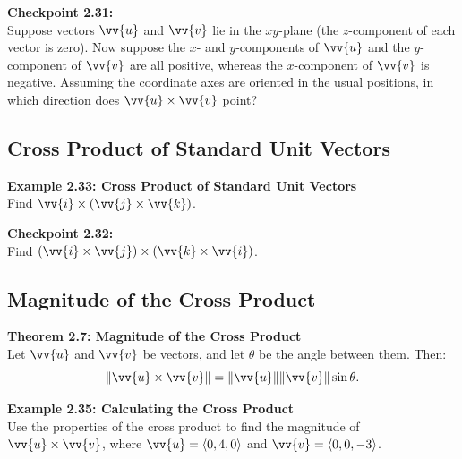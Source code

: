 \documentclass{article}
\begin{document}
\begin{exercisebox}
    \textbf{Checkpoint 2.31:} \\
    Suppose vectors \(\vv{u}\) and \(\vv{v}\) lie in the \(xy\)-plane (the \(z\)-component of each vector is zero). Now suppose the \(x\)- and \(y\)-components of \(\vv{u}\) and the \(y\)-component of \(\vv{v}\) are all positive, whereas the \(x\)-component of \(\vv{v}\) is negative. Assuming the coordinate axes are oriented in the usual positions, in which direction does \(\vv{u} \times \vv{v}\) point?
\end{exercisebox}

\subsection*{Cross Product of Standard Unit Vectors}

\begin{examplebox}
    \textbf{Example 2.33: Cross Product of Standard Unit Vectors} \\
    Find \(\vv{i} \times (\vv{j} \times \vv{k})\).
\end{examplebox}

\begin{exercisebox}
    \textbf{Checkpoint 2.32:} \\
    Find \((\vv{i} \times \vv{j}) \times (\vv{k} \times \vv{i})\).
\end{exercisebox}

\subsection*{Magnitude of the Cross Product}

\begin{theorembox}
    \textbf{Theorem 2.7: Magnitude of the Cross Product} \\
    Let \(\vv{u}\) and \(\vv{v}\) be vectors, and let \(\theta\) be the angle between them. Then:
    \[
    \|\vv{u} \times \vv{v}\| = \|\vv{u}\| \|\vv{v}\| \sin \theta.
    \]
\end{theorembox}

\begin{examplebox}
    \textbf{Example 2.35: Calculating the Cross Product} \\
    Use the properties of the cross product to find the magnitude of \(\vv{u} \times \vv{v}\), where \(\vv{u} = \langle 0, 4, 0 \rangle\) and \(\vv{v} = \langle 0, 0, -3 \rangle\).
\end{examplebox}
\end{document}
